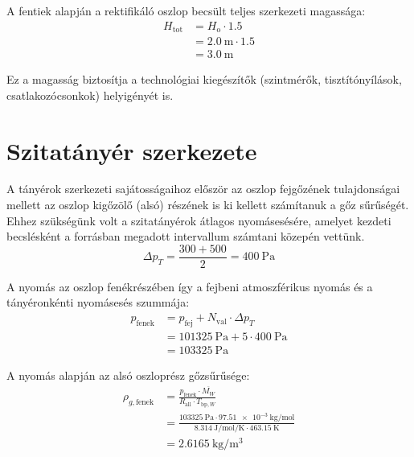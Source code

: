 A fentiek alapján a rektifikáló oszlop becsült teljes szerkezeti magassága:
\begin{equation}
  \begin{split}
    H_{\text{tot}} &= H_{\text{o}}\cdot\num{1.5}\\
    &= \qty{2.0}{\metre}\cdot\num{1.5}\\
    &= \qty{3.0}{\metre}
  \end{split}
\end{equation}

Ez a magasság biztosítja a technológiai kiegészítők (szintmérők,
tisztítónyílások, csatlakozócsonkok) helyigényét is.

\section{Szitatányér szerkezete}

A tányérok szerkezeti sajátosságaihoz először az oszlop fejgőzének
tulajdonságai mellett az oszlop kigőzölő (alsó) részének is ki
kellett számítanuk a gőz sűrűségét. Ehhez szükségünk volt a
szitatányérok átlagos nyomásesésére, amelyet kezdeti becslésként a
forrásban megadott intervallum számtani közepén vettünk.
\begin{equation}
  \Delta p_T = \frac{\num{300}+\num{500}}{2}=\qty{400}{\pascal}
\end{equation}

A nyomás az oszlop fenékrészében így a fejbeni atmoszférikus nyomás
és a tányéronkénti nyomásesés szummája:
\begin{equation}
  \begin{split}
    p_{\text{fenek}}&=p_{\text{fej}}+N_{\text{val}}\cdot\Delta
    p_T\\
    &=\qty{101325}{\pascal}+\num{5}\cdot\qty{400}{\pascal}\\
    &=\qty{103325}{\pascal}
  \end{split}
\end{equation}

A nyomás alapján az alsó oszloprész gőzsűrűsége:
\begin{equation}
  \begin{split}
    \rho_{g,\text{fenek}}&=\frac{p_{\text{fenek}}\cdot
    \overline{M_W}}{R_{\text{all}}\cdot T_{\text{bp},W}}\\
    &= \frac{\qty{103325}{\pascal}\cdot
    \qty{97.51e-3}{\kilo\gram\per\mol}}{\qty{8.314}{\joule\per\mol\per\kelvin}\cdot\qty{463.15}{\kelvin}}\\
    &= \qty{2.6165}{\kg\per\cubic\metre}
  \end{split}
\end{equation}

